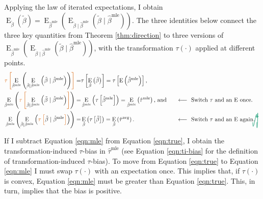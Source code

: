 \documentclass[12pt]{article}
\DeclareMathOperator*{\E}{\text{E}}
\newcommand{\tikzmark}[1]{\tikz[overlay,remember picture] \node (#1) {};}
\newcommand{\DrawBox}[2]{%
  \begin{tikzpicture}[overlay,remember picture]
    \draw[->,shorten >= 6pt, shorten <= 2pt, out=-90, in=85, distance=1.3cm, color2, thick] (MarkA.east) to (MarkB.east);
    \draw[->,shorten >= 6pt, shorten <= 2pt, out=-90, in=90, distance=1cm, color2, thick] (MarkC.west) to (MarkD.east);
  \end{tikzpicture}
}
\newcommand{\justif}[2]{&{#1}&\text{#2}}
\begin{document}
Applying the law of iterated expectations, I obtain $\E_{\tilde{\beta}} \left( \tilde{\beta} \right) = \E_{\hat{\beta}^\text{mle}}\left( \E_{\tilde{\beta} \mid \hat{\beta}^\text{mle}} (\tilde{\beta} \mid \hat{\beta}^\text{mle}) \right)$.
The three identities below connect the three key quantities from Theorem \ref{thm:direction} to three versions of $\E_{\hat{\beta}^\text{mle}}\left( \E_{\tilde{\beta} \mid \hat{\beta}^\text{mle}} (\tilde{\beta} \mid \hat{\beta}^\text{mle}) \right)$, with the transformation $\tau(\cdot)$ applied at different points.
\small
\begin{alignat}{2}
 \color{color1} \tikzmark{MarkA}\tau \left[ \normalcolor \E_{\hat{\beta}^\text{mle}}\left( \E_{\tilde{\beta} \mid \hat{\beta}^\text{mle}} \left( \tilde{\beta} \mid \hat{\beta}^\text{mle} \right) \right) \color{color1} \right] \normalcolor =&  \tau \left[ \E_{\tilde{\beta}} \left( \tilde{\beta} \right) \right] = \tau \left[\E \left( \hat{\beta}^\text{mle} \right) \right]\text{,} \label{eqn:true}\\
 \E_{\hat{\beta}^\text{mle}}\left( \color{color1} \tikzmark{MarkB}\tau\tikzmark{MarkC} \left[ \normalcolor \E_{\tilde{\beta} \mid \hat{\beta}^\text{mle}} \left( \tilde{\beta} \mid \hat{\beta}^\text{mle} \right) \color{color1} \right] \normalcolor \right)  =&  \E_{\hat{\beta}^\text{mle}} \left( \tau \left[\hat{\beta}^\text{mle} \right] \right) =  \E_{\hat{\beta}^\text{mle}} \left(\hat{\tau}^\text{mle} \right) \text{, and} \justif{\quad}{$\longleftarrow~$ Switch $\tau$ and an $\E$ once.} \label{eqn:mle}\\
\E_{\hat{\beta}^\text{mle}}\left( \E_{\tilde{\beta} \mid \hat{\beta}^\text{mle}} \left( \color{color1} \tikzmark{MarkD}\tau \left[ \normalcolor \tilde{\beta} \mid \hat{\beta}^\text{mle} \color{color1} \right] \normalcolor \right) \right)  =&
\E_{\tilde{\beta}} \left( \tau \left[\tilde{\beta} \right] \right)  =
\E_{\tilde{\beta}} \left(\hat{\tau}^\text{avg} \right) \text{.}\justif{\quad}{$\longleftarrow~$ Switch $\tau$ and an $\E$ again.}\label{eqn:avg}\DrawBox{red}{blue}
\end{alignat}
\normalsize

If I subtract Equation \ref{eqn:mle} from Equation \ref{eqn:true}, I obtain the transformation-induced $\tau$-bias in $\hat{\tau}^\text{mle}$ (see Equation \ref{eqn:ti-bias} for the definition of transformation-induced $\tau$-bias).
To move from Equation \ref{eqn:true} to Equation \ref{eqn:mle} I must swap $\tau(\cdot)$ with an expectation once.
This implies that, if $\tau(\cdot)$ is convex, Equation \ref{eqn:mle} must be greater than Equation \ref{eqn:true}.
This, in turn, implies that the bias is positive.
\end{document}
